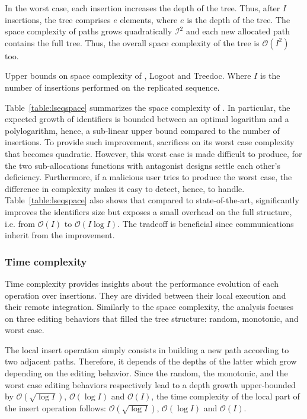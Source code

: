 In the worst case, each insertion increases the depth of the tree. Thus, after
$I$ insertions, the tree comprises $e$ elements, where $e$ is the depth of the
tree. The space complexity of paths grows quadratically $\mathcal{I}^2$ and each
new allocated path contains the full tree. Thus, the overall space complexity of
the tree is $\mathcal{O}(I^2)$ too.

\begin{table}
  \caption{\label{table:lseqspace}
    Upper bounds on space complexity of \LSEQ, Logoot and Treedoc. Where
    $I$ is the number of insertions performed on the replicated sequence.}
  \centering
  
\end{table}

Table~\ref{table:lseqspace} summarizes the space complexity of \LSEQ. In
particular, the expected growth of identifiers is bounded between an optimal
logarithm and a polylogarithm, hence, a sub-linear upper bound compared to the
number of insertions. To provide such improvement, \LSEQ sacrifices on its worst
case complexity that becomes quadratic. However, this worst case is made
difficult to produce, for the two sub-allocations functions with antagonist
designs settle each other's deficiency. Furthermore, if a malicious user tries
to produce the worst case, the difference in complexity makes it easy to detect,
hence, to handle. Table~\ref{table:lseqspace} also shows that compared to
state-of-the-art, \LSEQ significantly improves the identifiers size but exposes
a small overhead on the full structure, i.e. from $\mathcal{O}(I)$ to
$\mathcal{O}(I\log I)$. The tradeoff is beneficial since communications inherit
from the improvement.

\subsubsection{Time complexity}

Time complexity provides insights about the performance evolution of each
operation over insertions. They are divided between their local execution and
their remote integration.  Similarly to the space complexity, the analysis
focuses on three editing behaviors that filled the tree structure: random,
monotonic, and worst case.

The local insert operation simply consists in building a new path according to
two adjacent paths. Therefore, it depends of the depths of the latter which grow
depending on the editing behavior. Since the random, the monotonic, and the
worst case editing behaviors respectively lead to a depth growth upper-bounded
by $\mathcal{O}(\sqrt{\log I})$, $\mathcal{O}(\log I)$ and $\mathcal{O}(I)$, the
time complexity of the local part of the insert operation follows:
$\mathcal{O}(\sqrt{\log I})$, $\mathcal{O}(\log I)$ and $\mathcal{O}(I)$.

